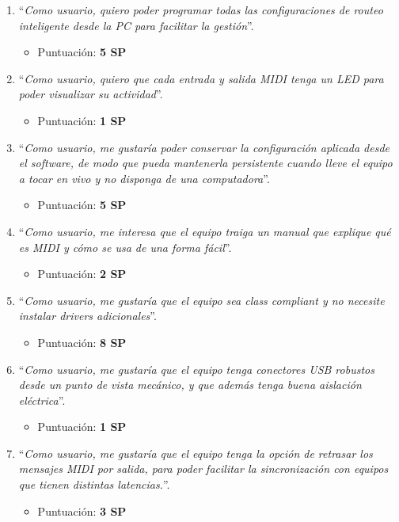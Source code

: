 \documentclass[
11pt, %
]{charter}
\begin{document}
\begin{enumerate}
	\item ``\emph{Como usuario, quiero poder programar todas las configuraciones de routeo inteligente desde la PC para facilitar la gestión}''.
	\begin{itemize}
		\item Puntuación: \textbf{5 SP}
	\end{itemize}
	\item ``\emph{Como usuario, quiero que cada entrada y salida MIDI tenga un LED para poder visualizar su actividad}''.
		\begin{itemize}
		\item Puntuación: \textbf{1 SP}
	\end{itemize}
	\item ``\emph{Como usuario, me gustaría poder conservar la configuración aplicada desde el software, de modo que pueda mantenerla persistente cuando lleve el equipo a tocar en vivo y no disponga de una computadora}''.
	\begin{itemize}
		\item Puntuación: \textbf{5 SP}
	\end{itemize}
	
	\item ``\emph{Como usuario, me interesa que el equipo traiga un manual que explique qué es MIDI y cómo se usa de una forma fácil}''.
	\begin{itemize}
		\item Puntuación: \textbf{2 SP}
	\end{itemize}
	\item ``\emph{Como usuario, me gustaría que el equipo sea class compliant y no necesite instalar drivers adicionales}''.
	\begin{itemize}
		\item Puntuación: \textbf{8 SP}
	\end{itemize}
	\item ``\emph{Como usuario, me gustaría que el equipo tenga conectores USB robustos desde un punto de vista mecánico, y que además tenga buena aislación eléctrica}''.
	\begin{itemize}
		\item Puntuación: \textbf{1 SP}
	\end{itemize}
	\item ``\emph{Como usuario, me gustaría que el equipo tenga la opción de retrasar los mensajes MIDI por salida, para poder facilitar la sincronización con equipos que tienen distintas latencias.}''.
	\begin{itemize}
		\item Puntuación: \textbf{3 SP}
	\end{itemize}
\end{enumerate}
\end{document}
